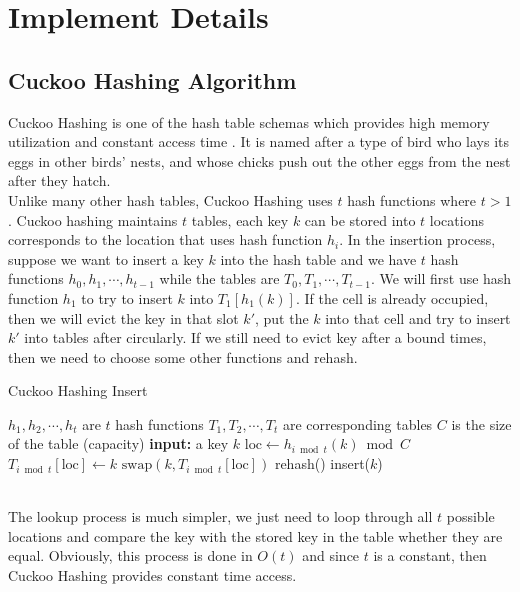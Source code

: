 \documentclass[10pt,twocolumn,letterpaper]{article}
\begin{document}
\section{Implement Details}

\subsection{Cuckoo Hashing Algorithm}

Cuckoo Hashing is one of the hash table schemas which provides high memory utilization and constant access time \cite{Chadalavada2017ImprovingCH}. It is named after a type of bird who lays its eggs in other birds' nests, and whose chicks push out the other eggs from the nest after they hatch. \\
Unlike many other hash tables, Cuckoo Hashing uses $t$ hash functions where $t > 1$. Cuckoo hashing maintains $t$ tables, each key $k$ can be stored into $t$ locations corresponds to the location that uses hash function $h_i$.
In the insertion process, suppose we want to insert a key $k$ into the hash table and we have $t$ hash functions $h_0, h_1, \cdots, h_{t - 1}$ while the tables are $T_0, T_1, \cdots, T_{t - 1}$. We will first use hash function $h_1$ to try to insert $k$ into $T_1[h_1(k)]$. If the cell is already occupied, then we will evict the key in that slot $k'$, put the $k$ into that cell and try to insert $k'$ into tables after circularly. If we still need to evict key after a bound times, then we need to choose some other functions and rehash.\\
\begin{algorithm} 
	\caption{Cuckoo Hashing Insert} 
	\label{basic_insert} 
	\begin{algorithmic}
	    \STATE $h_1, h_2, \cdots, h_t$ are $t$ hash functions
	    \STATE $T_1, T_2, \cdots, T_t$ are corresponding tables
	    \STATE $C$ is the size of the table (capacity)
	    \STATE \textbf{input:} a key $k$
	        \STATE $\text{loc} \gets h_{i \bmod t}(k) \bmod C$
	            \STATE $T_{i \bmod t}[\text{loc}] \gets k$
	            \RETURN
	        \ELSE
	            \STATE $\text{swap}(k, T_{i \bmod t}[\text{loc}])$
	        \ENDIF
	    \ENDFOR
	    \STATE rehash()
	    \STATE insert($k$)
	\end{algorithmic} 
\end{algorithm}\\
The lookup process is much simpler, we just need to loop through all $t$ possible locations and compare the key with the stored key in the table whether they are equal. Obviously, this process is done in $O(t)$ and since $t$ is a constant, then Cuckoo Hashing provides constant time access.
\end{document}
